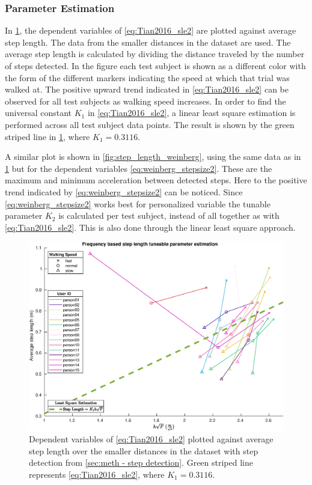 \subsubsection{Parameter Estimation}
\label{sec:results-step_length-parameter_estimation}
In \cref{fig:step_length_tian}, the dependent variables of \eqref{eq:Tian2016_sle2} are plotted against average step length. The data from the smaller distances in the \citet{Vezocnik2019} dataset are used. The average step length is calculated by dividing the distance traveled by the number of steps detected. In the figure each test subject is shown as a different color with the form of the different markers indicating the speed at which that trial was walked at. The positive upward trend indicated in \eqref{eq:Tian2016_sle2} can be observed for all test subjects as walking speed increases. In order to find the universal constant $K_1$ in \eqref{eq:Tian2016_sle2}, a linear least square estimation is performed across all test subject data points. The result is shown by the green striped line in \cref{fig:step_length_tian}, where $ K_1 = 0.3116$. \par 

A similar plot is shown in \cref{fig:step_length_weinberg}, using the same data as in \cref{fig:step_length_tian} but for the  dependent variables \eqref{eq:weinberg_stepsize2}. These are the maximum and minimum acceleration between detected steps. Here to the positive trend indicated by \eqref{eq:weinberg_stepsize2} can be noticed. Since \eqref{eq:weinberg_stepsize2} works best for personalized variable the tunable parameter $ K_2 $ is calculated per test subject, instead of all together as with \eqref{eq:Tian2016_sle2}. This is also done through the linear least square approach.

	\begin{figure}[H]
	\centering
	\includegraphics[width=0.8\linewidth]{images/20201128_1304_}
	\setlength{\belowcaptionskip}{-10pt}
	\caption{Dependent variables of \eqref{eq:Tian2016_sle2} plotted against average step length over the smaller distances in the \citet{Vezocnik2019} dataset with step detection from \cref{sec:meth - step detection}. Green striped line represents \eqref{eq:Tian2016_sle2}, where $ K_1 = 0.3116$.  }
	\label{fig:step_length_tian}
	\end{figure}

